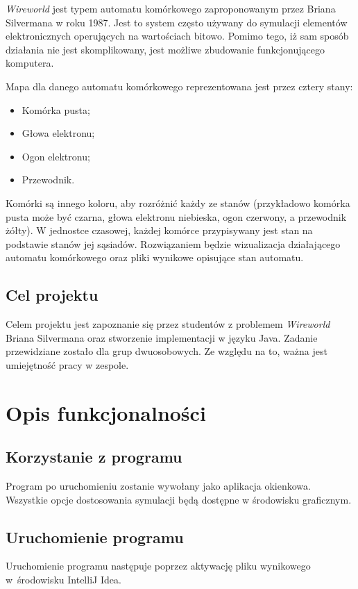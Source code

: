 \documentclass[a4paper,12pt]{article}
\begin{document}
\textit{Wireworld} jest typem automatu komórkowego zaproponowanym przez Briana Silvermana w roku 1987. Jest to system często używany do symulacji elementów elektronicznych operujących na wartościach bitowo. Pomimo tego, iż sam sposób działania nie jest skomplikowany, jest możliwe zbudowanie funkcjonującego komputera.

Mapa dla danego automatu komórkowego reprezentowana jest przez cztery stany:
\begin{itemize}
\item Komórka pusta;
\item Głowa elektronu;
\item Ogon elektronu;
\item Przewodnik.
\end{itemize}
Komórki są innego koloru, aby rozróżnić każdy ze stanów (przykładowo komórka pusta może być czarna, głowa elektronu niebieska, ogon czerwony, a przewodnik żółty). W jednostce czasowej, każdej komórce przypisywany jest stan na podstawie stanów jej sąsiadów. Rozwiązaniem będzie wizualizacja działającego automatu komórkowego oraz pliki wynikowe opisujące stan automatu.

\subsection{Cel projektu}
Celem projektu jest zapoznanie się przez studentów z problemem \textit{Wireworld} Briana Silvermana oraz stworzenie implementacji w języku Java. Zadanie przewidziane zostało dla grup dwuosobowych. Ze względu na to, ważna jest umiejętność pracy w zespole.

\section{Opis funkcjonalności}
\subsection{Korzystanie z programu}
Program po uruchomieniu zostanie wywołany jako aplikacja okienkowa. \linebreak Wszystkie opcje dostosowania symulacji będą dostępne w środowisku graficznym.

\subsection{Uruchomienie programu}
Uruchomienie programu następuje poprzez aktywację pliku wynikowego w~środowisku IntelliJ Idea.
\end{document}
